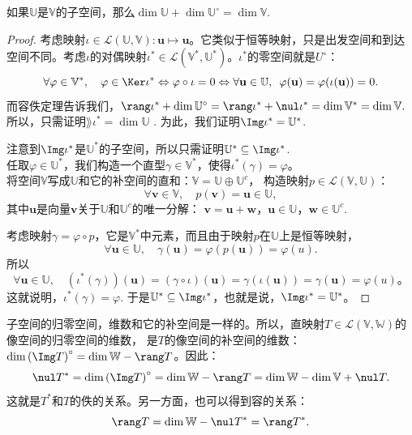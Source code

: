 \documentclass[12pt,UTF8,fontset=none]{ctexbook}
\begin{document}
\begin{pp}\label{pp:3_9}
如果$\mathbb{U}$是$\mathbb{V}$的子空间，那么$\dim\mathbb{U} + \dim\mathbb{U}^\circ = \dim \mathbb{V}.$
\end{pp}
\begin{proof} %
考虑映射$\iota \in \mathcal{L}(\mathbb{U}, \mathbb{V}) : \mathbf{u} \mapsto \mathbf{u}$。它类似于恒等映射，只是出发空间和到达空间不同。考虑$\iota$的对偶映射$\iota^* \in \mathcal{L}(\mathbb{V}^*, \mathbb{U}^*)$。$\iota^*$的零空间就是$U^\circ$：
$$ \forall \varphi \in \mathbb{V}^*, \quad \varphi \in \Ker \iota^* \Leftrightarrow \varphi \circ \iota = 0 \Leftrightarrow \forall \mathbf{u} \in\mathbb{U},\,\,\, \varphi (\mathbf{u}) = \varphi (\iota(\mathbf{u})) = 0.$$
而容佚定理告诉我们，$\rang \iota^* + \dim \mathbb{U}^\circ = \rang \iota^* + \nul \iota^* = \dim \mathbb{V}^* = \dim \mathbb{V}. $ 所以，只需证明$\rang \iota^* = \dim \mathbb{U}$ . 为此，我们证明$\Img \iota^* = \mathbb{U}^*$.

注意到$\Img \iota^*$是$\mathbb{U}^*$的子空间，所以只需证明$\mathbb{U}^* \subseteq \Img \iota^*$. \\
任取$\varphi \in \mathbb{U}^* $，我们构造一个直型$\gamma \in \mathbb{V}^*$，使得$\iota^*(\gamma) = \varphi$。\\
将空间$\mathbb{V}$写成$\mathbb{U}$和它的补空间的直和：$\mathbb{V} = \mathbb{U} \oplus \mathbb{U}^c$，
构造映射$p \in \mathcal{L}(\mathbb{V}, \mathbb{U})$：
$$ \forall  \mathbf{v} \in \mathbb{V}, \quad p(\mathbf{v}) = \mathbf{u} \in \mathbb{U},$$
其中$\mathbf{u}$是向量$\mathbf{v}$关于$\mathbb{U}$和$\mathbb{U}^c$的唯一分解：
$\mathbf{v} = \mathbf{u} + \mathbf{w}$，$\mathbf{u} \in \mathbb{U}$，$\mathbf{w} \in \mathbb{U}^c$.

考虑映射$\gamma = \varphi \circ p$，它是$\mathbb{V}^*$中元素，而且由于映射$p$在$\mathbb{U}$上是恒等映射，
$$ \forall \mathbf{u} \in \mathbb{U}, \quad \gamma(\mathbf{u}) = \varphi(p(\mathbf{u})) = \varphi(u).$$
所以
$$ \forall \mathbf{u} \in \mathbb{U}, \quad (\iota^*(\gamma))(\mathbf{u}) = (\gamma \circ \iota)(\mathbf{u}) = \gamma(\iota(\mathbf{u})) = \gamma(\mathbf{u}) = \varphi(u)。$$
这就说明，$\iota^*(\gamma) = \varphi$. 于是$\mathbb{U}^* \subseteq \Img \iota^*$，也就是说，$\Img \iota^* = \mathbb{U}^*$。
\end{proof}

子空间的归零空间，维数和它的补空间是一样的。所以，直映射$T \in \mathcal{L}(\mathbb{V}, \mathbb{W})$的像空间的归零空间的维数，
是$T$的像空间的补空间的维数：$\dim \left(\Img T\right)^\circ = \dim \mathbb{W} - \rang T$。因此：
$$ \nul T^* = \dim \left(\Img T\right)^\circ = \dim \mathbb{W} - \rang T = \dim \mathbb{W} - \dim \mathbb{V} + \nul T.$$
这就是$T^*$和$T$的佚的关系。另一方面，也可以得到容的关系：
$$ \rang T = \dim \mathbb{W} - \nul T^* =  \rang T^*. $$
\end{document}
